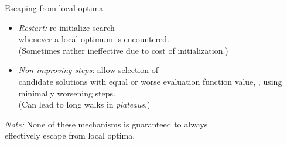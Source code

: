 % 
% 
\begin{frame}[c]{Escaping from local optima}

\onslide<+->
\begin{itemize}
\item \emph{Restart:} re-initialize search\\ whenever a local optimum 
        is encountered.\\
         (Sometimes rather ineffective due to cost of initialization.)

\medskip

\onslide<+->
\item \emph{Non-improving steps}:  allow selection of \\
        candidate solutions with equal or worse evaluation function value,
        \eg{}, using minimally worsening steps.\\
        (Can lead to long walks in \emph{plateaus}.)
        
\end{itemize}

\bigskip

\onslide<+->
\emph{Note:} None of these mechanisms is guaranteed to always \\
        effectively escape from local optima.
        
\end{frame}
% 
% 
% 
% 
% 
% 
